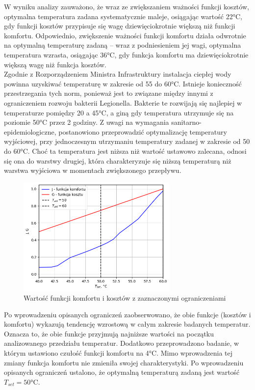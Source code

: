 \documentclass[a4paper,twoside,12pt]{book}
\begin{document}
W wyniku analizy zauważono, że wraz ze zwiększaniem ważności funkcji kosztów, optymalna temperatura zadana systematycznie maleje, osiągając wartość 22°C, gdy funkcji kosztów przypisuje się wagę dziewięciokrotnie większą niż funkcji komfortu. Odpowiednio, zwiększenie ważności funkcji komfortu działa odwrotnie na optymalną temperaturę zadaną – wraz z podniesieniem jej wagi, optymalna temperatura wzrasta, osiągając 36°C, gdy funkcja komfortu ma dziewięciokrotnie większą wagę niż funkcja kosztów.\\


Zgodnie z Rozporządzeniem Ministra Infrastruktury\cite{bib:Dziennik_ustaw_1, bib:Dziennik_ustaw_2}  instalacja ciepłej wody powinna uzyskiwać temperaturę w zakresie od 55 do 60°C. Istnieje konieczność przestrzegania tych norm, ponieważ jest to związane między innymi z ograniczeniem rozwoju bakterii Legionella. Bakterie te rozwijają się najlepiej w temperaturze pomiędzy 20 a 45°C, a giną gdy temperatura utrzymuje się na poziomie 50°C przez 2 godziny\cite{bib:CWU_TEMP}. Z uwagi na wymagania sanitarno-epidemiologiczne, postanowiono przeprowadzić optymalizację temperatury wyjściowej, przy jednoczesnym utrzymaniu temperatury zadanej w zakresie od 50 do 60°C. Choć ta temperatura jest niższa niż wartość ustawowo zalecana, odnosi się ona do warstwy drugiej, która charakteryzuje się niższą temperaturą niż warstwa wyjściowa w momentach zwiększonego przepływu.

\newpage
\begin{figure}[!h]
  \centering
  \includegraphics[width=0.7\textwidth]{img/Opty_ogra.png}
  \caption{Wartość funkcji komfortu i kosztów z zaznaczonymi ograniczeniami}
  \label{fig:etykieta-rysunku}
\end{figure}
Po wprowadzeniu opisanych ograniczeń zaobserwowano, że obie funkcje (kosztów i komfortu) wykazują tendencję wzrostową w całym zakresie badanych temperatur. Oznacza to, że obie funkcje przyjmują najniższe wartości na początku analizowanego przedziału temperatur. Dodatkowo przeprowadzono badanie, w którym ustawiono czułość funkcji komfortu na 4°C. Mimo wprowadzenia tej zmiany funkcja komfortu nie zmieniła swojej charakterystyki. Po wprowadzeniu opisanych ograniczeń ustalono, że optymalną temperaturą zadaną jest wartość $T_{set}=50$°C.
\end{document}
